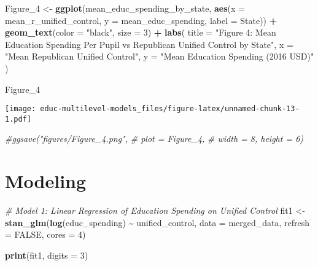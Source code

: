 \documentclass[
]{article}
\newenvironment{Shaded}{\begin{snugshade}}{\end{snugshade}}
\newcommand{\AttributeTok}[1]{\textcolor[rgb]{0.13,0.29,0.53}{#1}}
\newcommand{\CommentTok}[1]{\textcolor[rgb]{0.56,0.35,0.01}{\textit{#1}}}
\newcommand{\ConstantTok}[1]{\textcolor[rgb]{0.56,0.35,0.01}{#1}}
\newcommand{\DecValTok}[1]{\textcolor[rgb]{0.00,0.00,0.81}{#1}}
\newcommand{\FunctionTok}[1]{\textcolor[rgb]{0.13,0.29,0.53}{\textbf{#1}}}
\newcommand{\NormalTok}[1]{#1}
\newcommand{\OtherTok}[1]{\textcolor[rgb]{0.56,0.35,0.01}{#1}}
\newcommand{\SpecialCharTok}[1]{\textcolor[rgb]{0.81,0.36,0.00}{\textbf{#1}}}
\newcommand{\StringTok}[1]{\textcolor[rgb]{0.31,0.60,0.02}{#1}}
\begin{document}
\begin{Shaded}
\begin{Highlighting}[]
\NormalTok{Figure\_4 }\OtherTok{\textless{}{-}} \FunctionTok{ggplot}\NormalTok{(mean\_educ\_spending\_by\_state, }\FunctionTok{aes}\NormalTok{(}\AttributeTok{x =}\NormalTok{ mean\_r\_unified\_control, }\AttributeTok{y =}\NormalTok{ mean\_educ\_spending, }\AttributeTok{label =}\NormalTok{ State)) }\SpecialCharTok{+}
  \FunctionTok{geom\_text}\NormalTok{(}\AttributeTok{color =} \StringTok{"black"}\NormalTok{, }\AttributeTok{size =} \DecValTok{3}\NormalTok{) }\SpecialCharTok{+}
  \FunctionTok{labs}\NormalTok{(}
    \AttributeTok{title =} \StringTok{"Figure 4: Mean Education Spending Per Pupil vs Republican Unified Control by State"}\NormalTok{,}
    \AttributeTok{x =} \StringTok{"Mean Republican Unified Control"}\NormalTok{,}
    \AttributeTok{y =} \StringTok{"Mean Education Spending (2016 USD)"}
\NormalTok{  )}

\NormalTok{Figure\_4}
\end{Highlighting}
\end{Shaded}

\texttt{[image: educ-multilevel-models\_files/figure-latex/unnamed-chunk-13-1.pdf]}

\begin{Shaded}
\begin{Highlighting}[]
\CommentTok{\#ggsave("figures/Figure\_4.png", }
\CommentTok{\#       plot = Figure\_4, }
\CommentTok{\#       width = 8, height = 6)}
\end{Highlighting}
\end{Shaded}

\hypertarget{modeling}{%
\section{Modeling}\label{modeling}}

\begin{Shaded}
\begin{Highlighting}[]
\CommentTok{\# Model 1: Linear Regression of Education Spending on Unified Control}
\NormalTok{fit1 }\OtherTok{\textless{}{-}} \FunctionTok{stan\_glm}\NormalTok{(}\FunctionTok{log}\NormalTok{(educ\_spending) }\SpecialCharTok{\textasciitilde{}}\NormalTok{ unified\_control,}
                   \AttributeTok{data =}\NormalTok{ merged\_data,}
                   \AttributeTok{refresh =} \ConstantTok{FALSE}\NormalTok{,}
                   \AttributeTok{cores =} \DecValTok{4}\NormalTok{)}

\FunctionTok{print}\NormalTok{(fit1, }\AttributeTok{digits =} \DecValTok{3}\NormalTok{)}
\end{Highlighting}
\end{Shaded}
\end{document}
